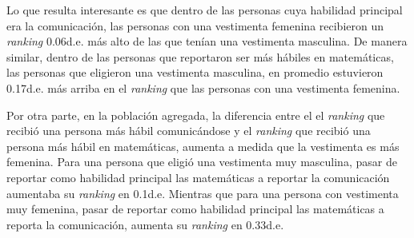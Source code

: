 Lo que resulta interesante es que dentro de las personas cuya habilidad principal era la comunicación, las personas con una vestimenta femenina recibieron un \textit{ranking} 0.06d.e. más alto de las que tenían una vestimenta masculina. De manera similar, dentro de las personas que reportaron ser más hábiles en matemáticas, las personas que eligieron una vestimenta masculina, en promedio estuvieron 0.17d.e. más arriba en el \textit{ranking} que las personas con una vestimenta femenina. 

Por otra parte, en la población agregada, la diferencia entre el el \textit{ranking} que recibió una persona más hábil comunicándose y el \textit{ranking} que recibió una persona más hábil en matemáticas, aumenta a medida que la vestimenta es más femenina. Para una persona que eligió una vestimenta muy masculina, pasar de reportar como habilidad principal las matemáticas a reportar la comunicación aumentaba su \textit{ranking} en 0.1d.e. Mientras que para una persona con vestimenta muy femenina, pasar de reportar como habilidad principal las matemáticas a reporta la comunicación, aumenta su \textit{ranking} en 0.33d.e. 

